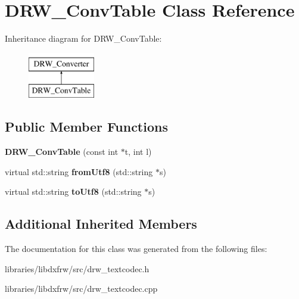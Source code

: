 \hypertarget{classDRW__ConvTable}{\section{D\-R\-W\-\_\-\-Conv\-Table Class Reference}
\label{classDRW__ConvTable}
}
Inheritance diagram for D\-R\-W\-\_\-\-Conv\-Table\-:\begin{figure}[H]
\begin{center}
\leavevmode
\includegraphics[height=2.000000cm]{classDRW__ConvTable}
\end{center}
\end{figure}
\subsection*{Public Member Functions}
\begin{DoxyCompactItemize}
\item 
\hypertarget{classDRW__ConvTable_a64889febda58e8cfb28f4abc5706ab15}{{\bfseries D\-R\-W\-\_\-\-Conv\-Table} (const int $\ast$t, int l)}\label{classDRW__ConvTable_a64889febda58e8cfb28f4abc5706ab15}

\item 
\hypertarget{classDRW__ConvTable_ac882456d17f8c84647647a531a427953}{virtual std\-::string {\bfseries from\-Utf8} (std\-::string $\ast$s)}\label{classDRW__ConvTable_ac882456d17f8c84647647a531a427953}

\item 
\hypertarget{classDRW__ConvTable_ad80301e5b01a734fbc5131e2b98edbb9}{virtual std\-::string {\bfseries to\-Utf8} (std\-::string $\ast$s)}\label{classDRW__ConvTable_ad80301e5b01a734fbc5131e2b98edbb9}

\end{DoxyCompactItemize}
\subsection*{Additional Inherited Members}


The documentation for this class was generated from the following files\-:\begin{DoxyCompactItemize}
\item 
libraries/libdxfrw/src/drw\-\_\-textcodec.\-h\item 
libraries/libdxfrw/src/drw\-\_\-textcodec.\-cpp\end{DoxyCompactItemize}
